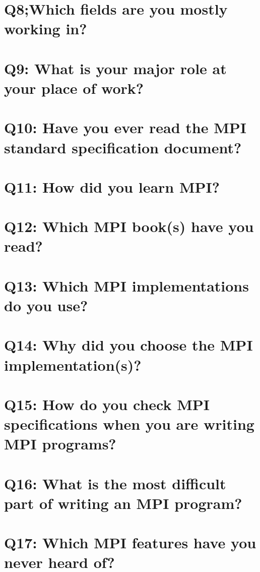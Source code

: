 \documentclass{report}
\begin{document}
\clearpage
\section{Q8;Which fields are you mostly working in?}


\clearpage
\section{Q9: What is your major role at your place of work?}


\clearpage
\section{Q10: Have you ever read the MPI standard specification document?}


\clearpage
\section{Q11: How did you learn MPI?}


\clearpage
\section{Q12: Which MPI book(s) have you read?}


\clearpage
\section{Q13: Which MPI implementations do you use?}


\clearpage
\section{Q14: Why did you choose the MPI implementation(s)?}


\clearpage
\section{Q15: How do you check MPI specifications when you are writing MPI programs?}


\clearpage
\section{Q16: What is the most difficult part of writing an MPI program?}


\clearpage
\section{Q17: Which MPI features have you never heard of?}

\end{document}
